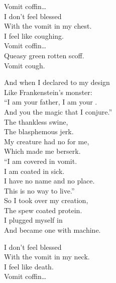 



Vomit coffin… \\

I don't feel blessed \\
With the vomit in my chest. \\
I feel like coughing. \\

Vomit coffin… \\

Queasy green rotten scoff. \\
Vomit cough. \\


And when I declared to my design \\
Like Frankenstein's monster: \\
``I am your father, I am your . \\
And you the magic that I conjure.'' \\

The thankless swine, \\
The blasphemous jerk. \\
My creature had no  for me, \\
Which made me berserk. \\

``I am covered in vomit. \\
I am coated in sick. \\
I have no name and no place. \\
This is no way to live.'' \\

So I took over my creation, \\
The spew coated protein. \\
I plugged myself in \\
And became one with machine. \\


I don't feel blessed \\
With the vomit in my neck. \\
I feel like death. \\

Vomit coffin… \\

